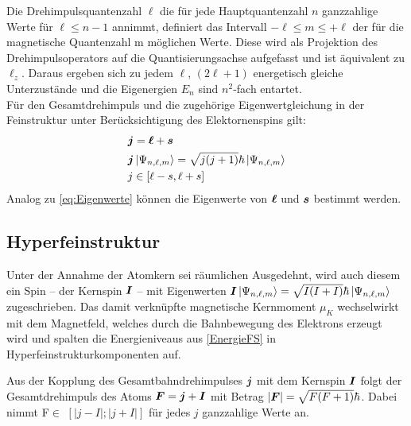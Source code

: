 \noindent Die Drehimpulsquantenzahl $\ell$ die für jede Hauptquantenzahl $n$ ganzzahlige Werte für $\ell \leq n- 1 $ annimmt, definiert das Intervall $-\ell \leq m \leq + \ell$ der für die magnetische Quantenzahl m möglichen Werte. Diese wird als Projektion des Drehimpulsoperators auf die Quantisierungsachse aufgefasst und ist äquivalent zu $\ell_{z}$. Daraus ergeben sich zu jedem $\ell$, $(2\ell +1)$ energetisch gleiche Unterzustände und die Eigenergien $E_{n}$ sind $n^2$-fach entartet. \cite{Bloch}\\

\noindent Für den Gesamtdrehimpuls und die zugehörige Eigenwertgleichung in der Feinstruktur unter Berücksichtigung des Elektornenspins gilt:
\begin{align}
    &\boldsymbol{j}=\boldsymbol{\ell} + \boldsymbol{s}\\
    &\boldsymbol{j}\ket{\Psi_{n, \ell, m}}=\sqrt{j(j+1)}\hbar\ket{\Psi_{n,\ell,m}}\label{eq:Eigenwerte}\\ 
    &j \in [\ell - s, \ell + s]
\end{align}
\noindent Analog zu \eqref{eq:Eigenwerte} können die Eigenwerte von $\boldsymbol{\ell}$ und $\boldsymbol{s}$ bestimmt werden.


\subsection{Hyperfeinstruktur}

\noindent Unter der Annahme der Atomkern sei räumlichen Ausgedehnt, wird auch diesem ein Spin -- der Kernspin $\boldsymbol{I}$ -- mit Eigenwerten $\boldsymbol{I}\ket{\Psi_{n, \ell, m}}=\sqrt{I(I+I)}\hbar\ket{\Psi_{n,\ell,m}}$ zugeschrieben. Das damit verknüpfte magnetische Kernmoment $\mu_{K}$ wechselwirkt mit dem Magnetfeld, welches durch die Bahnbewegung des Elektrons erzeugt wird und spalten  die Energieniveaus aus \eqref{EnergieFS} in Hyperfeinstrukturkomponenten auf.


\noindent Aus der Kopplung des Gesamtbahndrehimpulses $\boldsymbol{j}$ mit dem Kernspin $\boldsymbol{I}$ folgt der Gesamtdrehimpuls des Atoms $\boldsymbol{F}=\boldsymbol{j}+\boldsymbol{I}$ mit Betrag $\lvert \boldsymbol{F} \rvert = \sqrt{F(F+1)}\hbar$. Dabei nimmt F$\in$ $[\lvert j-I\rvert;\lvert j+I\rvert]$ für jedes $j$ ganzzahlige Werte an.

